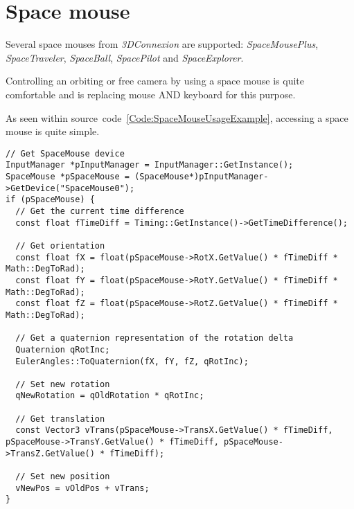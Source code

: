 \section{Space mouse}
Several space mouses from \emph{3DConnexion} are supported: \emph{SpaceMousePlus}, \emph{SpaceTraveler}, \emph{SpaceBall}, \emph{SpacePilot} and \emph{SpaceExplorer}.

Controlling an orbiting or free camera by using a space mouse is quite comfortable and is replacing mouse AND keyboard for this purpose.

As seen within source~code~\ref{Code:SpaceMouseUsageExample}, accessing a space mouse is quite simple.
\begin{lstlisting}[float=htb,label=Code:SpaceMouseUsageExample,caption={Space mouse usage example}]
// Get SpaceMouse device
InputManager *pInputManager = InputManager::GetInstance();
SpaceMouse *pSpaceMouse = (SpaceMouse*)pInputManager->GetDevice("SpaceMouse0");
if (pSpaceMouse) {
  // Get the current time difference
  const float fTimeDiff = Timing::GetInstance()->GetTimeDifference();

  // Get orientation
  const float fX = float(pSpaceMouse->RotX.GetValue() * fTimeDiff * Math::DegToRad);
  const float fY = float(pSpaceMouse->RotY.GetValue() * fTimeDiff * Math::DegToRad);
  const float fZ = float(pSpaceMouse->RotZ.GetValue() * fTimeDiff * Math::DegToRad);

  // Get a quaternion representation of the rotation delta
  Quaternion qRotInc;
  EulerAngles::ToQuaternion(fX, fY, fZ, qRotInc);

  // Set new rotation
  qNewRotation = qOldRotation * qRotInc;

  // Get translation
  const Vector3 vTrans(pSpaceMouse->TransX.GetValue() * fTimeDiff, pSpaceMouse->TransY.GetValue() * fTimeDiff, pSpaceMouse->TransZ.GetValue() * fTimeDiff);

  // Set new position
  vNewPos = vOldPos + vTrans;
}
\end{lstlisting}
